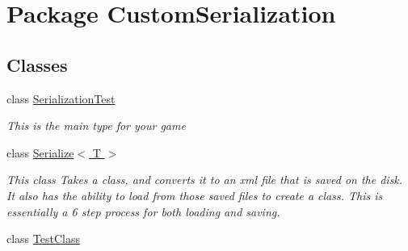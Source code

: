 \hypertarget{namespace_custom_serialization}{\section{Package Custom\-Serialization}
\label{namespace_custom_serialization}
}
\subsection*{Classes}
\begin{DoxyCompactItemize}
\item 
class \hyperlink{class_custom_serialization_1_1_serialization_test}{Serialization\-Test}
\begin{DoxyCompactList}\small\item\em This is the main type for your game \end{DoxyCompactList}\item 
class \hyperlink{class_custom_serialization_1_1_serialize_3_01_t_01_4}{Serialize$<$ T $>$}
\begin{DoxyCompactList}\small\item\em This class Takes a class, and converts it to an xml file that is saved on the disk. It also has the ability to load from those saved files to create a class. This is essentially a 6 step process for both loading and saving. \end{DoxyCompactList}\item 
class \hyperlink{class_custom_serialization_1_1_test_class}{Test\-Class}
\end{DoxyCompactItemize}
